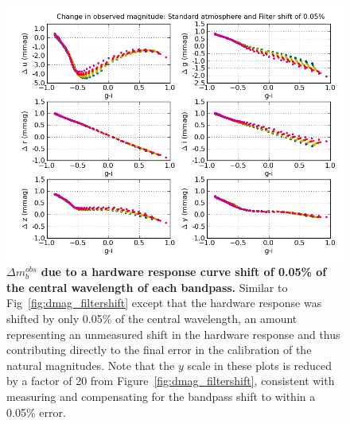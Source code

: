 \documentclass[12pt,preprint]{aastex}
\begin{document}
\begin{figure}
\centering
\includegraphics[width=6in]{delta_mags_filtershift_small}
\caption{{\small 
{\bf $\Delta m_b^{obs}$ due to a hardware
response curve shift of 0.05\% of the central wavelength of each
bandpass.} Similar to Fig~\ref{fig:dmag_filtershift} except that the
hardware response was shifted by only 0.05\% of the central
wavelength, an amount representing an unmeasured shift in the hardware
response and thus contributing directly to the final error in the
calibration of the natural magnitudes. Note that the $y$ scale in
these plots is reduced by a factor of 20 from
Figure~\ref{fig:dmag_filtershift}, consistent with measuring and
compensating for the
bandpass shift to within a 0.05\% error. }}
\label{fig:dmag_filtershift_small} 
\end{figure}
 

\end{document}
